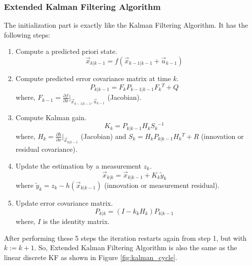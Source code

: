 \subsubsection{Extended Kalman Filtering Algorithm}
The initialization part is exactly like the Kalman Filtering Algorithm. It has the following steps\cite{aich2010study}:
\begin{enumerate}
  \item  Compute a predicted priori state.
  $$\vec{x}_{k|k-1} = f( \vec{x}_{k-1|k-1} + \vec{u}_{k-1})$$
  \item Compute predicted error covariance matrix at time $k$.
  $$P_{k|k-1} = F_{k}P_{k-1|k-1} F{_{k}}^T + Q$$
  where, $F_{k-1} = \frac{\partial f}{\partial x} |_{\vec{x}_{k-1|k-1},\vec{u}_{k-1}}$ (Jacobian).
  \item Compute Kalman gain.
  $$K_{k} = P_{k|k-1}H_{k}S{_{k}}^{-1}$$
  where, $H_{k} = \frac{\partial h}{\partial x} |_{\vec{x}_{k|k-1}}$ (Jacobian) and $S_{k} = H_{k}P_{k|k-1}H{_{k}}^T + R$ (innovation or residual covariance).
  \item Update the estimation by a measurement $z_{k}$.
  $$\vec{x}_{k|k} = \vec{x}_{k|k-1} + K_{k}\tilde y_{k}$$
  where $\tilde y_{k}=z_{k}-h(\vec{x}_{k|k-1})$ (innovation or measurement residual).
  \item Update error covariance matrix.
  $$P_{k|k} = (I - k_{k}H_{k})P_{k|k-1}$$
  where, $I$ is the identity matrix.
\end{enumerate}
After performing these 5 steps the iteration restarts again from step 1, but with $k:=k+1$.
So, Extended Kalman Filtering Algorithm is also the same as the linear discrete KF as shown in Figure \ref{fig:kalman_cycle}\cite{bishop2001introduction}.



